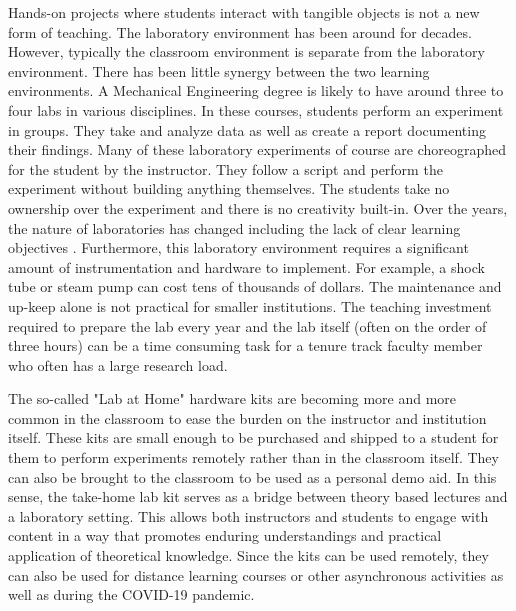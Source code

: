 Hands-on projects where students interact with tangible objects is not
a new form of teaching. The laboratory environment has been around for
decades. However, typically the classroom environment is separate from
the laboratory environment.  There has been little synergy between the
two learning environments. A Mechanical Engineering degree is likely
to have around three to four labs in various disciplines. In these
courses, students perform an experiment in groups. They take and
analyze data as well as create a report documenting their
findings. Many of these laboratory experiments of course are
choreographed for the student by the instructor. They follow a script
and perform the experiment without building anything themselves. The
students take no ownership over the experiment and there is no
creativity built-in. Over the years, the nature of laboratories has
changed including the lack of clear learning
objectives \cite{Labs}. Furthermore, this laboratory environment
requires a significant amount of instrumentation and hardware to
implement. For example, a shock tube or steam pump can cost tens of
thousands of dollars. The maintenance and up-keep alone is not
practical for smaller institutions. The teaching investment required
to prepare the lab every year and the lab itself (often on the order
of three hours) can be a time consuming task for a tenure track
faculty member who often has a large research load. 

The so-called "Lab at Home" hardware kits are becoming more and more
common in the classroom to ease the burden on the instructor and
institution itself\cite{LabAtHome}. These kits are small enough to be
purchased and shipped to a student for them to perform experiments
remotely rather than in the classroom itself\cite{LabAtHome1}. They
can also be brought to the classroom to be used as a personal demo
aid\cite{LabAtHome2_EE}. In this sense, the take-home lab kit serves
as a bridge between theory based lectures and a laboratory
setting\cite{LabAtHome3}. This allows both instructors and students to
engage with content in a way that promotes enduring understandings and
practical application of theoretical
knowledge\cite{LabAtHome4_EE}. Since the kits can be used remotely,
they can also be used for distance learning courses or other
asynchronous activities as well as during the COVID-19 pandemic.   

